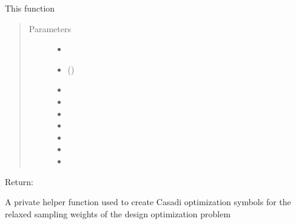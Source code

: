 \documentclass[letterpaper,10pt,english,openany,oneside]{sphinxmanual}
\begin{document}
\begin{fulllineitems}
\begin{fulllineitems}
This function
\begin{quote}\begin{description}
\item[{Parameters}] \leavevmode\begin{itemize}
\item {} 
 \textendash{} 

\item {} 
\sphinxstyleliteralstrong{\sphinxupquote{(}}\sphinxstyleliteralstrong{\sphinxupquote{)}} () \textendash{} 

\item {} 
\sphinxstyleliteralstrong{\sphinxupquote{(}}\sphinxstyleliteralstrong{\sphinxupquote{)}} \textendash{} 

\item {} 
\sphinxstyleliteralstrong{\sphinxupquote{(}}\sphinxstyleliteralstrong{\sphinxupquote{)}} \textendash{} 

\item {} 
\sphinxstyleliteralstrong{\sphinxupquote{(}}\sphinxstyleliteralstrong{\sphinxupquote{)}} \textendash{} 

\item {} 
\sphinxstyleliteralstrong{\sphinxupquote{(}}\sphinxstyleliteralstrong{\sphinxupquote{)}} \textendash{} 

\item {} 
\sphinxstyleliteralstrong{\sphinxupquote{(}}\sphinxstyleliteralstrong{\sphinxupquote{)}} \textendash{} 

\item {} 
\sphinxstyleliteralstrong{\sphinxupquote{(}}\sphinxstyleliteralstrong{\sphinxupquote{)}} \textendash{} 

\item {} 
 \textendash{} 

\end{itemize}

\end{description}\end{quote}

Return:

\end{fulllineitems}


\begin{fulllineitems}
\label{\detokenize{nloed:nloed.design.Design.__weighting_settup}}
A private helper function used to create Casadi optimization symbols for the relaxed
sampling weights of the design optimization problem


\end{fulllineitems}
\end{fulllineitems}
\end{document}
